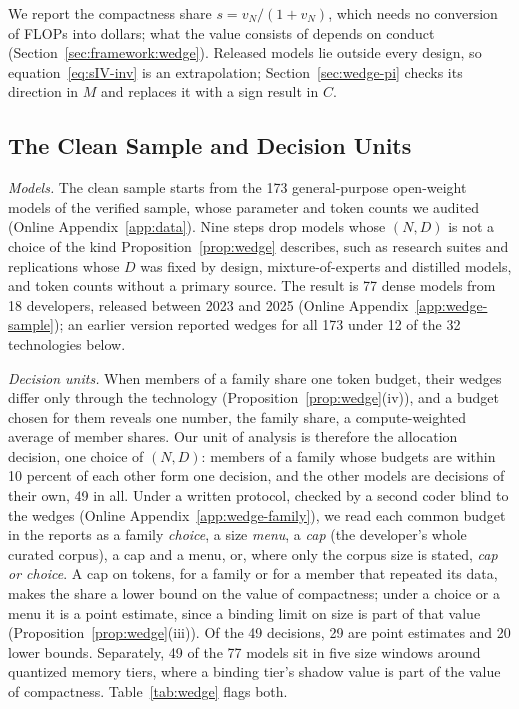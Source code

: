 We report the compactness share $s=v_N/(1+v_N)$, which needs no conversion of FLOPs into dollars; what the value consists
of depends on conduct (Section~\ref{sec:framework:wedge}). Released models lie outside every design, so
equation~\eqref{eq:sIV-inv} is an extrapolation; Section~\ref{sec:wedge-pi} checks its direction in $M$ and replaces it
with a sign result in $C$.

\subsection{The Clean Sample and Decision Units}\label{sec:wedge-data}

\textit{Models.} The clean sample starts from the 173 general-purpose open-weight models of the verified sample, whose
parameter and token counts we audited (Online Appendix~\ref{app:data}). Nine steps drop models whose $(N,D)$ is not a
choice of the kind Proposition~\ref{prop:wedge} describes, such as research suites and replications whose $D$ was fixed
by design, mixture-of-experts and distilled models, and token counts without a primary source. The result is 77 dense
models from 18 developers, released between 2023 and 2025 (Online Appendix~\ref{app:wedge-sample}); an earlier version
reported wedges for all 173 under 12 of the 32 technologies below.

\textit{Decision units.} When members of a family share one token budget, their wedges differ only through the
technology (Proposition~\ref{prop:wedge}(iv)), and a budget chosen for them reveals one number, the family share, a
compute-weighted average of member shares. Our unit of analysis is therefore the allocation decision, one choice of
$(N,D)$: members of a family whose budgets are within 10 percent of each other form one decision, and the other models
are decisions of their own, 49 in all. Under a written protocol, checked by a second coder blind to the wedges (Online
Appendix~\ref{app:wedge-family}), we read each common budget in the reports as a family \emph{choice}, a size
\emph{menu}, a \emph{cap} (the developer's whole curated corpus), a cap and a menu, or, where only the corpus size is
stated, \emph{cap or choice}. A cap on tokens, for a family or for a member that repeated its data, makes the share a
lower bound on the value of compactness; under a choice or a menu it is a point estimate, since a binding limit on size
is part of that value (Proposition~\ref{prop:wedge}(iii)). Of the 49 decisions, 29 are point estimates and 20 lower
bounds. Separately, 49 of the 77 models sit in five size windows around quantized memory tiers, where a binding tier's
shadow value is part of the value of compactness. Table~\ref{tab:wedge} flags both.

